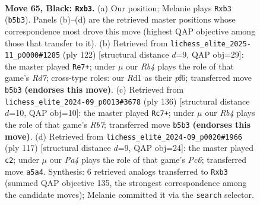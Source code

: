 \documentclass[11pt]{article}
\begin{document}
\clearpage

\begin{figure}[p]\centering
\begin{subfigure}{0.46\textwidth}\centering
\resizebox{\linewidth}{!}{%
\newchessgame
\chessboard[
  setfen={8/R7/7k/pr6/5K2/1P6/7P/3r4 b - - 5 65},
  showmover=false,
  pgfstyle=straightmove, color=movearrow, markmove={b5-b3}
]}
\caption{}
\end{subfigure}\hfill
\begin{subfigure}{0.46\textwidth}\centering
\resizebox{\linewidth}{!}{%
\newchessgame
\chessboard[
  setfen={8/3R3P/5p2/7r/8/4k3/3p2P1/6K1 w - - 4 62},
  showmover=false,
  pgfstyle=straightmove, color=movearrow, markmove={d7-e7}
]}
\caption{}
\end{subfigure}
\\[4pt]
\begin{subfigure}{0.46\textwidth}\centering
\resizebox{\linewidth}{!}{%
\newchessgame
\chessboard[
  setfen={7r/1R5P/8/8/8/2k5/1p3K2/8 w - - 12 69},
  showmover=false,
  pgfstyle=straightmove, color=movearrow, markmove={b7-c7}
]}
\caption{}
\end{subfigure}\hfill
\begin{subfigure}{0.46\textwidth}\centering
\resizebox{\linewidth}{!}{%
\newchessgame
\chessboard[
  setfen={4k3/2R5/5P2/4K3/8/2p2r2/8/8 b - - 0 59},
  showmover=false,
  pgfstyle=straightmove, color=movearrow, markmove={c3-c2}
]}
\caption{}
\end{subfigure}
\caption{\textbf{Move 65, Black: \texttt{Rxb3}.} (a) Our position; Melanie plays \texttt{Rxb3} (\texttt{b5b3}). Panels (b)--(d) are the retrieved master positions whose correspondence most drove this move (highest QAP objective among those that transfer to it). (b) Retrieved from \texttt{lichess\_elite\_2025-11\_p0000\#1285} (ply 122) [structural distance $d$=9, QAP obj=29]: the master played \texttt{Re7+}; under $\mu$ our \emph{Rb4} plays the role of that game's \emph{Rd7}; cross-type roles: our \emph{R}d1 as their \emph{p}f6; transferred move \texttt{b5b3} \textbf{(endorses this move)}. (c) Retrieved from \texttt{lichess\_elite\_2024-09\_p0013\#3678} (ply 136) [structural distance $d$=10, QAP obj=10]: the master played \texttt{Rc7+}; under $\mu$ our \emph{Rb4} plays the role of that game's \emph{Rb7}; transferred move \texttt{b5b3} \textbf{(endorses this move)}. (d) Retrieved from \texttt{lichess\_elite\_2024-09\_p0020\#1966} (ply 117) [structural distance $d$=9, QAP obj=24]: the master played \texttt{c2}; under $\mu$ our \emph{Pa4} plays the role of that game's \emph{Pc6}; transferred move \texttt{a5a4}. Synthesis: 6 retrieved analogs transferred to \texttt{Rxb3} (summed QAP objective 135, the strongest correspondence among the candidate moves); Melanie committed it via the \texttt{search} selector.}
\label{fig:thought-m129}
\end{figure}
\end{document}
